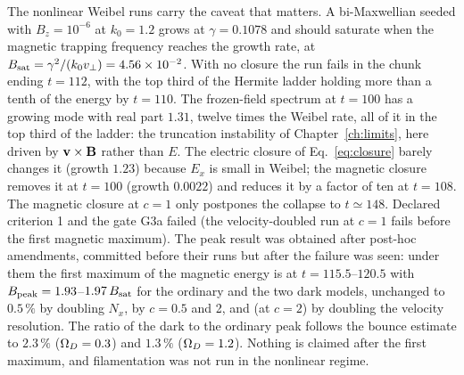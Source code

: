 \begin{table}[t]
\caption{B09, linear Weibel instability, ordinary plasma: relative error of the fitted growth rate $\gamma$ against the kinetic root at the base level, the velocity-refined level, and the $N_n$ ladder. Gate: the finest refinement step is below $10^{-4}$.}\label{tab:b09}
\small
{}
\end{table}

The nonlinear Weibel runs carry the caveat that matters. A bi-Maxwellian seeded with $B_z=10^{-6}$ at $k_0=1.2$ grows at $\gamma=0.1078$ and should saturate when the magnetic trapping frequency reaches the growth rate, at $B_{\rm sat}=\gamma^2/(k_0v_\perp)=4.56\times10^{-2}$. With no closure the run fails in the chunk ending $t=112$, with the top third of the Hermite ladder holding more than a tenth of the energy by $t=110$. The frozen-field spectrum at $t=100$ has a growing mode with real part $1.31$, twelve times the Weibel rate, all of it in the top third of the ladder: the truncation instability of Chapter~\ref{ch:limits}, here driven by $\mathbf{v}\times\mathbf{B}$ rather than $E$. The electric closure of Eq.~\eqref{eq:closure} barely changes it (growth $1.23$) because $E_x$ is small in Weibel; the magnetic closure removes it at $t=100$ (growth $0.0022$) and reduces it by a factor of ten at $t=108$. The magnetic closure at $c=1$ only postpones the collapse to $t\simeq148$. Declared criterion 1 and the gate G3a failed (the velocity-doubled run at $c=1$ fails before the first magnetic maximum). The peak result was obtained after post-hoc amendments, committed before their runs but after the failure was seen: under them the first maximum of the magnetic energy is at $t=115.5$--$120.5$ with $B_{\rm peak}=1.93$--$1.97\,B_{\rm sat}$ for the ordinary and the two dark models, unchanged to $0.5\,\%$ by doubling $N_x$, by $c=0.5$ and 2, and (at $c=2$) by doubling the velocity resolution. The ratio of the dark to the ordinary peak follows the bounce estimate to $2.3\,\%$ ($\Omega_D=0.3$) and $1.3\,\%$ ($\Omega_D=1.2$). Nothing is claimed after the first maximum, and filamentation was not run in the nonlinear regime.

